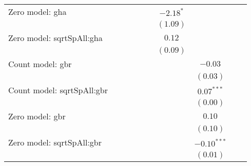 \begin{center}
\begin{longtable}{l c c c c c c c c c}
Zero model: gha                &                &                &               &               &               & $-2.18^{*}$     &               &               &                 \\
                               &                &                &               &               &               & $(1.09)$        &               &               &                 \\
Zero model: sqrtSpAll:gha      &                &                &               &               &               & $0.12$          &               &               &                 \\
                               &                &                &               &               &               & $(0.09)$        &               &               &                 \\
Count model: gbr               &                &                &               &               &               &                 & $-0.03$       &               &                 \\
                               &                &                &               &               &               &                 & $(0.03)$      &               &                 \\
Count model: sqrtSpAll:gbr     &                &                &               &               &               &                 & $0.07^{***}$  &               &                 \\
                               &                &                &               &               &               &                 & $(0.00)$      &               &                 \\
Zero model: gbr                &                &                &               &               &               &                 & $0.10$        &               &                 \\
                               &                &                &               &               &               &                 & $(0.10)$      &               &                 \\
Zero model: sqrtSpAll:gbr      &                &                &               &               &               &                 & $-0.10^{***}$ &               &                 \\
                               &                &                &               &               &               &                 & $(0.01)$      &               &                 \\

\end{longtable}
\end{center}

